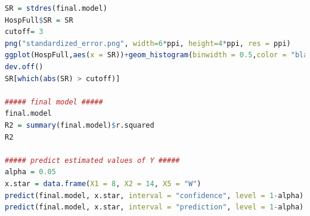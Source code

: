 \documentclass[a4paper,11pt,onecolumn,twoside]{article}
\begin{document}
\begin{lstlisting}[language=R,caption={R script for Project 1}]
SR = stdres(final.model)
HospFull$SR = SR
cutoff= 3
png("standardized_error.png", width=6*ppi, height=4*ppi, res = ppi)
ggplot(HospFull,aes(x = SR))+geom_histogram(binwidth = 0.5,color = "black",fill = "white")+ xlab("standardized error")
dev.off()
SR[which(abs(SR) > cutoff)] 

##### final model #####
final.model
R2 = summary(final.model)$r.squared
R2

##### predict estimated values of Y #####
alpha = 0.05
x.star = data.frame(X1 = 8, X2 = 14, X5 = "W")
predict(final.model, x.star, interval = "confidence", level = 1-alpha)
predict(final.model, x.star, interval = "prediction", level = 1-alpha)
\end{lstlisting} 
\end{document}
